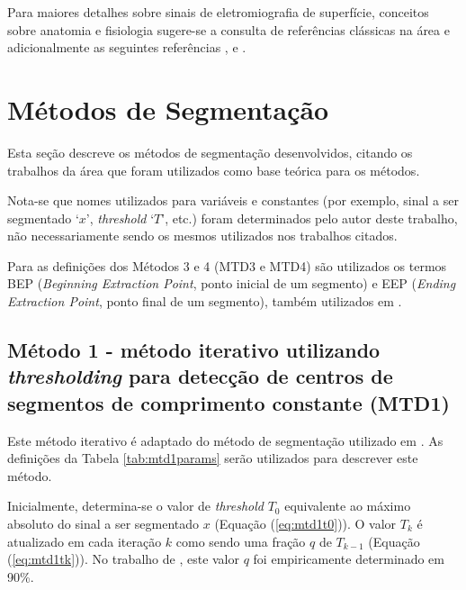 Para maiores detalhes sobre sinais de eletromiografia de superfície, conceitos sobre anatomia e fisiologia sugere-se a consulta de referências clássicas na área e adicionalmente as seguintes referências \cite{Favieiro2009}, \cite{Lopes2014} e \cite{Schons2014}.

		\section{Métodos de Segmentação}
\label{sec:MTDs}
Esta seção descreve os métodos de segmentação desenvolvidos, citando os trabalhos da área que foram utilizados como base teórica para os métodos.

Nota-se que nomes utilizados para variáveis e constantes (por exemplo, sinal a ser segmentado `$x$', \emph{threshold} `$T$', etc.) foram determinados pelo autor deste trabalho, não necessariamente sendo os mesmos utilizados nos trabalhos citados.

Para as definições dos Métodos 3 e 4 (MTD3 e MTD4) são utilizados os termos BEP (\emph{Beginning Extraction Point}, ponto inicial de um segmento) e EEP (\emph{Ending Extraction Point}, ponto final de um segmento), também utilizados em \cite{Pattichis1995}.
	
				\subsection{Método 1 - método iterativo utilizando \emph{thresholding} para detecção de centros de segmentos de comprimento constante (MTD1)}
Este método iterativo é adaptado do método de segmentação utilizado em \cite{Chauvet2001}. As definições da Tabela \ref{tab:mtd1params} serão utilizados para descrever este método.



Inicialmente, determina-se o valor de \emph{threshold} $T_0$ equivalente ao máximo absoluto do sinal a ser segmentado $x$ (Equação (\ref{eq:mtd1t0})). O valor $T_k$ é atualizado em cada iteração $k$ como sendo uma fração $q$ de $T_{k-1}$ (Equação (\ref{eq:mtd1tk})). No trabalho de \cite{Chauvet2001}, este valor $q$ foi empiricamente determinado em 90\%.

